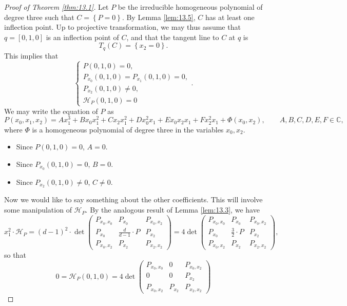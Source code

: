 \documentclass{article}
\newcommand{\C}{\mathbb{C}}
\renewcommand{\H}{\mathcal{H}}
\newcommand{\rb}[1]{\left( #1 \right)}
\renewcommand{\sb}[1]{\left[ #1 \right]}
\newcommand{\cb}[1]{\left\{ #1 \right\}}
\theoremstyle{definition}\newtheorem{definition}{Definition}[section]
\theoremstyle{definition}\newtheorem{notation}[definition]{Notation}
\theoremstyle{definition}\newtheorem{remark}[definition]{Remark}
\theoremstyle{definition}\newtheorem{example1}[definition]{Example}
\theoremstyle{definition}\newtheorem{fact}{Fact}
\theoremstyle{definition}\newtheorem{exercise}{Exercise}
\theoremstyle{definition}\newtheorem*{example2}{Example}
\begin{document}
\begin{proof}[Proof of Theorem \ref{thm:13.1}]
Let $ P $ be the irreducible homogeneous polynomial of degree three such that $ C = \cb{P = 0} $. By Lemma \ref{lem:13.5}, $ C $ has at least one inflection point. Up to projective transformation, we may thus assume that $ q = \sb{0, 1, 0} $ is an inflection point of $ C $, and that the tangent line to $ C $ at $ q $ is
$$ T_q\rb{C} = \cb{x_2 = 0}. $$
This implies that
$$ \begin{cases}
P\rb{0, 1, 0} = 0, \\
P_{x_0}\rb{0, 1, 0} = P_{x_1}\rb{0, 1, 0} = 0, \\
P_{x_2}\rb{0, 1, 0} \ne 0, \\
\H_P\rb{0, 1, 0} = 0
\end{cases}. $$
We may write the equation of $ P $ as
$$ P\rb{x_0, x_1, x_2} = Ax_1^3 + Bx_0x_1^2 + Cx_2x_1^2 + Dx_0^2x_1 + Ex_0x_2x_1 + Fx_2^2x_1 + \Phi\rb{x_0, x_2}, \qquad A, B, C, D, E, F \in \C, $$
where $ \Phi $ is a homogeneous polynomial of degree three in the variables $ x_0, x_2 $.
\begin{itemize}
\item Since $ P\rb{0, 1, 0} = 0 $, $ A = 0 $.
\item Since $ P_{x_0}\rb{0, 1, 0} = 0 $, $ B = 0 $.
\item Since $ P_{x_2}\rb{0, 1, 0} \ne 0 $, $ C \ne 0 $.
\end{itemize}
Now we would like to say something about the other coefficients. This will involve some manipulation of $ \H_P $. By the analogous result of Lemma \ref{lem:13.3}, we have
$$ x_1^2 \cdot \H_P = \rb{d - 1}^2 \cdot \det\begin{pmatrix}
P_{x_0, x_0} & P_{x_0} & P_{x_0, x_2} \\
P_{x_0} & \tfrac{d}{d - 1} \cdot P & P_{x_2} \\
P_{x_0, x_2} & P_{x_2} & P_{x_2, x_2}
\end{pmatrix} = 4\det\begin{pmatrix}
P_{x_0, x_0} & P_{x_0} & P_{x_0, x_2} \\
P_{x_0} & \tfrac{3}{2} \cdot P & P_{x_2} \\
P_{x_0, x_2} & P_{x_2} & P_{x_2, x_2}
\end{pmatrix}, $$
so that
$$ 0 = \H_P\rb{0, 1, 0} = 4\det\begin{pmatrix}
P_{x_0, x_0} & 0 & P_{x_0, x_2} \\
0 & 0 & P_{x_2} \\
P_{x_0, x_2} & P_{x_2} & P_{x_2, x_2}

\end{pmatrix}$$
\end{proof}
\end{document}
